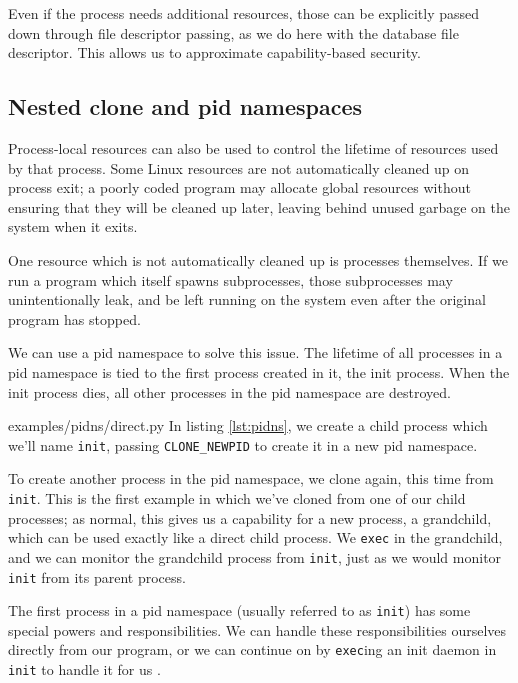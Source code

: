 \documentclass[letterpaper,twocolumn,10pt]{article}
\begin{document}
Even if the process needs additional resources,
those can be explicitly passed down through file descriptor passing,
as we do here with the database file descriptor.
This allows us to approximate capability-based security\cite{capsicum}.
\subsection{Nested clone and pid namespaces}\label{pidns}
Process-local resources can also be used to control the lifetime of resources used by that process.
Some Linux resources are not automatically cleaned up on process exit;
a poorly coded program may allocate global resources
without ensuring that they will be cleaned up later,
leaving behind unused garbage on the system when it exits.

One resource which is not automatically cleaned up is processes themselves.
If we run a program which itself spawns subprocesses,
those subprocesses may unintentionally leak,
and be left running on the system even after the original program has stopped\cite{caternfork}.

We can use a pid namespace to solve this issue.
The lifetime of all processes in a pid namespace is tied to the first process created in it,
the init process.
When the init process dies,
all other processes in the pid namespace are destroyed\cite{pid_namespaces}.


{examples/pidns/direct.py}
In listing \ref{lst:pidns},
we create a child process which we'll name \texttt{init},
passing \verb|CLONE_NEWPID| to create it in a new pid namespace\cite{clone}.

To create another process in the pid namespace,
we clone again, this time from \texttt{init}.
This is the first example in which we've cloned from one of our child processes;
as normal, this gives us a capability for a new process, a grandchild,
which can be used exactly like a direct child process.
We \texttt{exec} in the grandchild,
and we can monitor the grandchild process from \texttt{init},
just as we would monitor \texttt{init} from its parent process.

The first process in a pid namespace (usually referred to as \texttt{init})
has some special powers and responsibilities\cite{pid_namespaces}.
We can handle these responsibilities ourselves directly from our program,
or we can continue on by \texttt{exec}ing an init daemon in \texttt{init} to handle it for us
\cite{tini}\cite{dumb_init}.
\end{document}
